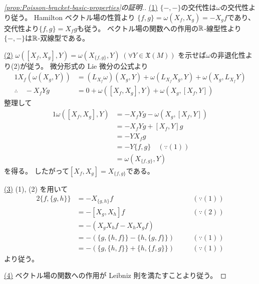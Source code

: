 \documentclass[report,dvipdfmx]{jlreq}
\begin{document}
\begin{proof}[\cref{prop:Poisson-bracket-basic-properties}の証明.]
    \uline{(1)} \quad
    $\{ {-}, {-} \}$の交代性は$\omega$の交代性より従う。
    Hamilton ベクトル場の性質より
    $\{ f, g \} = \omega(X_f, X_g) = - X_g f$であり、
    交代性より$\{ f, g \} = X_f g$も従う。
    ベクトル場の関数への作用の$\mathbb{R}$-線型性より
    $\{ {-}, {-} \}$は$\mathbb{R}$-双線型である。

    \uline{(2)} \quad
    $\omega([X_f, X_g], Y) = \omega(X_{\{f, g\}}, Y) \; (\forall Y \in \mathfrak{X}(M))$
    を示せば$\omega$の非退化性より(2)が従う。
    微分形式の Lie 微分の公式より
    \begin{alignat}{1}
        X_f (\omega(X_g, Y))
            &=
                (L_{X_f} \omega)(X_g, Y)
                + \omega(L_{X_f} X_g, Y)
                + \omega(X_g, L_{X_f} Y)
                \\
        \therefore \quad
        - X_f Y g
            &=
                0
                + \omega([X_f, X_g], Y)
                + \omega(X_g, [X_f, Y])
    \end{alignat}
    整理して
    \begin{alignat}{1}
        \omega([X_f, X_g], Y)
            &=
                - X_f Y g
                - \omega(X_g, [X_f, Y])
                \\
            &=
                - X_f Y g
                + [X_f, Y] g
                \\
            &=
                - Y X_f g
                \\
            &=
                - Y \{f, g\}
                \quad
                (\because (1))
                \\
            &=
                \omega(X_{\{f, g\}}, Y)
    \end{alignat}
    を得る。
    したがって$[X_f, X_g] = X_{\{f, g\}}$である。

    \uline{(3)} \quad
    (1), (2) を用いて
    \begin{alignat}{2}
        \{ f, \{ g, h \} \}
            &=
                - X_{\{g, h\}} f
                \quad
                &&(\because (1))
                \\
            &=
                - [X_g, X_h] f
                \quad
                &&(\because (2))
                \\
            &=
                - (X_g X_h f - X_h X_g f)
                \\
            &=
                - (\{ g, \{ h, f \} \} - \{ h, \{ g, f \} \})
                \quad
                &&(\because (1))
                \\
            &=
                - (\{ g, \{ h, f \} \} + \{ h, \{ f, g \} \})
                \quad
                &&(\because (1))
    \end{alignat}
    より従う。

    \uline{(4)} \quad
    ベクトル場の関数への作用が Leibniz 則を満たすことより従う。
\end{proof}
\end{document}
